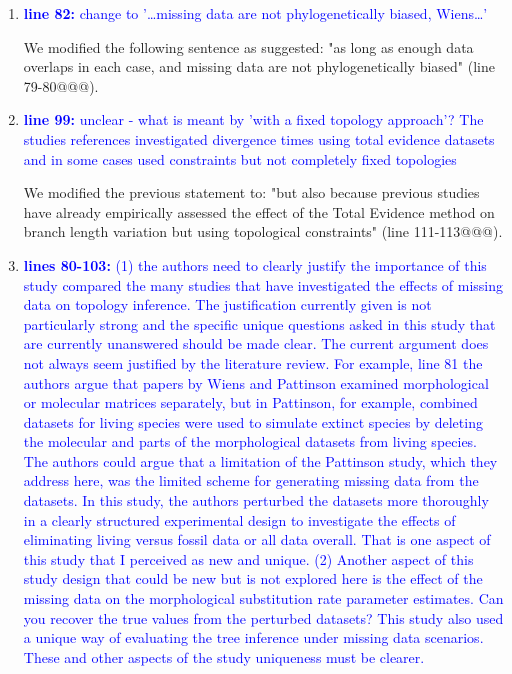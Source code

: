 \documentclass[12pt,letterpaper]{article}
\begin{document}
\begin{enumerate}
\item{\textcolor{blue}{\textbf{line 82:} change to '…missing data are not phylogenetically biased, Wiens…'}}

We modified the following sentence as suggested: "as long as enough data overlaps in each case, and missing data are not phylogenetically biased" (line 79-80@@@).

\item{\textcolor{blue}{\textbf{line 99:} unclear - what is meant by 'with a fixed topology approach'? The studies references investigated divergence times using total evidence datasets and in some cases used constraints but not completely fixed topologies}}

We modified the previous statement to: "but also because previous studies have already empirically assessed the effect of the Total Evidence method on branch length variation but using topological constraints" (line 111-113@@@).

\item{\textcolor{blue}{\textbf{lines 80-103:} (1) the authors need to clearly justify the importance of this study compared the many studies that have investigated the effects of missing data on topology inference.
The justification currently given is not particularly strong and the specific unique questions asked in this study that are currently unanswered should be made clear.
The current argument does not always seem justified by the literature review.
For example, line 81 the authors argue that papers by Wiens and Pattinson examined morphological or molecular matrices separately, but in Pattinson, for example, combined datasets for living species were used to simulate extinct species by deleting the molecular and parts of the morphological datasets from living species.
The authors could argue that a limitation of the Pattinson study, which they address here, was the limited scheme for generating missing data from the datasets.
In this study, the authors perturbed the datasets more thoroughly in a clearly structured experimental design to investigate the effects of eliminating living versus fossil data or all data overall.
That is one aspect of this study that I perceived as new and unique.
(2) Another aspect of this study design that could be new but is not explored here is the effect of the missing data on the morphological substitution rate parameter estimates.
Can you recover the true values from the perturbed datasets?
This study also used a unique way of evaluating the tree inference under missing data scenarios.
These and other aspects of the study uniqueness must be clearer.}}


\end{enumerate}
\end{document}
